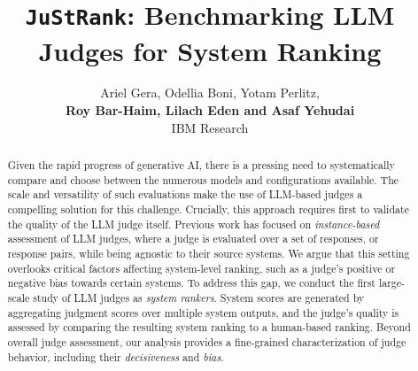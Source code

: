 \documentclass[11pt]{article}
\title{\texttt{JuStRank}: Benchmarking LLM Judges for System Ranking}
\author{Ariel Gera, Odellia Boni, Yotam Perlitz, \\
\textbf{Roy Bar-Haim, Lilach Eden and Asaf Yehudai}\\
 IBM Research}
\begin{document}
\maketitle
\begin{abstract}
Given the rapid progress of generative AI, there is a pressing need to systematically compare and choose between the numerous models and configurations available. The scale and versatility of such evaluations make the use of LLM-based judges a compelling solution for this challenge. Crucially, this approach requires first to validate the quality of the LLM judge itself. Previous work has focused on \emph{instance-based} assessment of LLM judges, where a judge is evaluated over a set of responses, or response pairs, while being agnostic to their source systems. We argue that this setting overlooks critical factors affecting system-level ranking, such as a judge's positive or negative bias towards certain systems. To address this gap, we conduct the first large-scale study of LLM judges as \emph{system rankers}. System scores are generated by aggregating judgment scores over multiple system outputs, and the judge's quality is assessed by comparing the resulting system ranking to a human-based ranking.
Beyond overall judge assessment, our analysis provides a fine-grained characterization of judge behavior, including their \emph{decisiveness} and \emph{bias}.




\end{abstract}



%


\appendix

\end{document}
